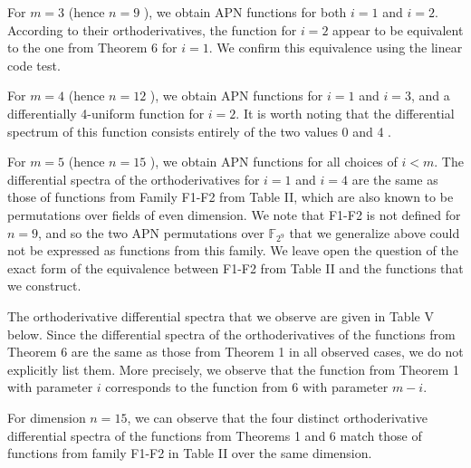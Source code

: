 \documentclass[10pt]{article}
\begin{document}
For $m=3$ (hence $n=9$ ), we obtain APN functions for both $i=1$ and $i=2$. According to their orthoderivatives, the function for $i=2$ appear to be equivalent to the one from Theorem 6 for $i=1$. We confirm this equivalence using the linear code test.

For $m=4$ (hence $n=12$ ), we obtain APN functions for $i=1$ and $i=3$, and a differentially 4-uniform function for $i=2$. It is worth noting that the differential spectrum of this function consists entirely of the two values 0 and 4 .

For $m=5$ (hence $n=15$ ), we obtain APN functions for all choices of $i<m$. The differential spectra of the orthoderivatives for $i=1$ and $i=4$ are the same as those of functions from Family F1-F2 from Table II, which are also known to be permutations over fields of even dimension. We note that F1-F2 is not defined for $n=9$, and so the two APN permutations over $\mathbb{F}_{2^{9}}$ that we generalize above could not be expressed as functions from this family. We leave open the question of the exact form of the equivalence between F1-F2 from Table II and the functions that we construct.

The orthoderivative differential spectra that we observe are given in Table V below. Since the differential spectra of the orthoderivatives of the functions from Theorem 6 are the same as those from Theorem 1 in all observed cases, we do not explicitly list them. More precisely, we observe that the function from Theorem 1 with parameter $i$ corresponds to the function from 6 with parameter $m-i$.

For dimension $n=15$, we can observe that the four distinct orthoderivative differential spectra of the functions from Theorems 1 and 6 match those of functions from family F1-F2 in Table II over the same dimension.
\end{document}
